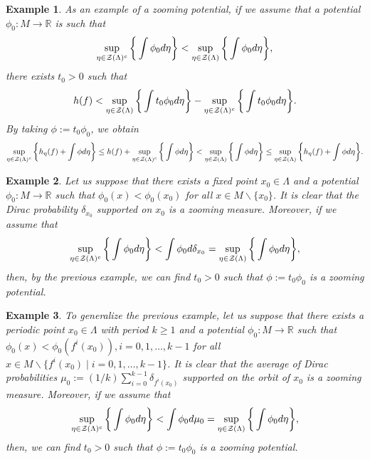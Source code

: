 \documentclass[12pt,a4paper]{amsart}
\theoremstyle{plain}
\newtheorem{example}{Example}[subsection]
\begin{document}
\begin{example}\label{Base}
	As an example of a zooming potential, if we assume that a potential $\phi_{0} : M \to \mathbb{R}$ is such that
	\[
	\displaystyle  \sup_{\eta \in \mathcal{Z}(\Lambda)^{c}} \bigg{\{} \int \phi_{0} d\eta \bigg{\}} < \sup_{\eta \in \mathcal{Z}(\Lambda)} \bigg{\{} \int \phi_{0} d\eta \bigg{\}},
	\]
	there exists $t_{0} > 0$ such that
	\[
	h(f) < \sup_{\eta \in \mathcal{Z}(\Lambda)} \bigg{\{} \int t_{0}\phi_{0} d\eta \bigg{\}} - \sup_{\eta \in \mathcal{Z}(\Lambda)^{c}} \bigg{\{} \int t_{0}\phi_{0} d\eta \bigg{\}}.
	\]
	By taking $\phi:=t_{0}\phi_{0}$, we obtain
	\[
	\displaystyle  \sup_{\eta \in \mathcal{Z}(\Lambda)^{c}} \bigg{\{}h_{\eta}(f) + \int \phi d\eta \bigg{\}} \leq h(f) + \sup_{\eta \in \mathcal{Z}(\Lambda)^{c}} \bigg{\{} \int \phi d\eta \bigg{\}}< \sup_{\eta \in \mathcal{Z}(\Lambda)} \bigg{\{} \int \phi d\eta \bigg{\}} \leq \sup_{\eta \in \mathcal{Z}(\Lambda)} \bigg{\{}h_{\eta}(f) + \int \phi d\eta \bigg{\}}.
	\]
\end{example}

\begin{example} \label{Dirac}
	Let us suppose that there exists a fixed point $x_{0} \in \Lambda$ and a potential $\phi_{0} : M \to \mathbb{R}$ such that $\phi_{0}(x) < \phi_{0}(x_{0})$ for all $x \in M \backslash \{x_{0}\}$. It is clear that the Dirac probability $\delta_{x_{0}}$ supported on $x_{0}$ is a zooming measure. Moreover, if we assume that
	\[
	\displaystyle  \sup_{\eta \in \mathcal{Z}(\Lambda)^{c}} \bigg{\{} \int \phi_{0} d\eta \bigg{\}} < \int \phi_{0} d \delta_{x_{0}} = \sup_{\eta \in \mathcal{Z}(\Lambda)} \bigg{\{} \int \phi_{0} d\eta \bigg{\}},
	\]
	then, by the previous example, we can find $t_{0} > 0$ such that $\phi:= t_{0}\phi_{0}$ is a zooming potential.
\end{example}

\begin{example}\label{Periodic}
	To generalize the previous example, let us suppose that there exists a periodic point $x_{0} \in \Lambda$ with period $k \geq 1$ and a potential $\phi_{0} : M \to \mathbb{R}$ such that $\phi_{0}(x) < \phi_{0}(f^{i}(x_{0})), i=0,1,\dots,k-1$ for all $x \in M \backslash \{f^{i}(x_{0}) \mid i=0,1,\dots,k-1\}$. It is clear that the average of Dirac probabilities $\mu_{0}:=(1/k)\sum_{i=0}^{k-1}\delta_{f^{i}(x_{0})}$ supported on the orbit of $x_{0}$ is a zooming measure. Moreover, if we assume that
	\[
	\displaystyle  \sup_{\eta \in \mathcal{Z}(\Lambda)^{c}} \bigg{\{} \int \phi_{0} d\eta \bigg{\}} < \int \phi_{0} d \mu_{0} = \sup_{\eta \in \mathcal{Z}(\Lambda)} \bigg{\{} \int \phi_{0} d\eta \bigg{\}},
	\]
	then, we can find $t_{0} > 0$ such that $\phi:= t_{0}\phi_{0}$ is a zooming potential.
\end{example}
\end{document}
